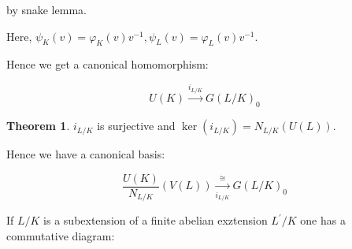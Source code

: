 \documentclass{article}
\theoremstyle{definition}
\newtheorem{theorem}{Theorem}
\numberwithin{theorem}{subsection}
\begin{document}
\begin{enumerate}[label=\arabic*)]
        \begin{center}
        \end{center}

        by snake lemma.

        Here, \(\psi_K(v) = \varphi_K(v) v ^{-1}, \psi_L(v) = \varphi_L(v) v ^{-1}\).

        Hence we get a canonical homomorphism:

        \[
            U(K) \xrightarrow{i_{L / K}} G(L / K)_0
        \]

        \begin{theorem}
            \(i_{L / K}\) is surjective and \(\ker(i_{L / K}) = N_{L / K}(U(L))\).
            
            Hence we have a canonical basis:

            \[
                \frac{U(K)}{N_{L / K}}(V(L)) \xrightarrow[i_{L / K}]{\cong} G(L / K)_0
            \]

            If \(L / K\) is a subextension of a finite abelian exztension \(L^{\prime} / K\) one has a commutative diagram:

            \begin{center}
            \end{center}
        \end{theorem}


\end{enumerate}
\end{document}

